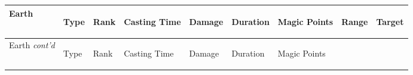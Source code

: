 \documentclass[twoside]{book}
\begin{document}
\begin{longtable}{p{1.25in}lp{2em}p{3em}llp{7em}ll} 
  Earth
  &
  \begin{turn}{70}{Type}\end{turn}
          
  &
  \begin{turn}{70}{Rank}\end{turn}
          
  &
  \begin{turn}{70}{Casting Time}\end{turn}
          
  &
  \begin{turn}{70}{Damage}\end{turn}
          
  &
  \begin{turn}{70}{Duration}\end{turn}
          
  &
  \begin{turn}{70}{Magic Points}\end{turn}
          
  &
  \begin{turn}{70}{Range}\end{turn}
          
  &
  \begin{turn}{70}{Target}\end{turn}
          
  \\
  \hline
  \hline
  \endfirsthead
  Earth \textit{cont'd}
        
  &
  \begin{turn}{70}{Type}\end{turn}
          
  &
  \begin{turn}{70}{Rank}\end{turn}
          
  &
  \begin{turn}{70}{Casting Time}\end{turn}
          
  &
  \begin{turn}{70}{Damage}\end{turn}
          
  &
  \begin{turn}{70}{Duration}\end{turn}
          
  &
  \begin{turn}{70}{Magic Points}\end{turn}
          

\end{longtable}
\end{document}
